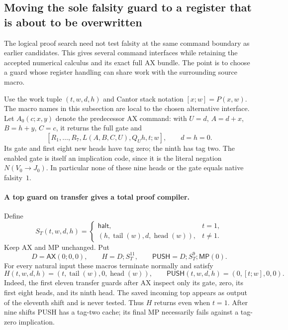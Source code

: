 \subsection{Moving the sole falsity guard to a register that is about to be overwritten}
\label{sec:guard-relocation}
The logical proof search need not test falsity at the same command boundary
as earlier candidates.  This gives several command interfaces while retaining
the accepted numerical calculus and its exact full AX bundle.  The point is
to choose a guard whose register handling can share work with the surrounding
source macro.

Use the work tuple $(t,w,d,h)$ and Cantor stack notation $[x;w]=P(x,w)$.
The macro names in this subsection are local to the chosen alternative
interface. Let $A_0(c;x,y)$ denote the predecessor AX command: with
$U=d$, $A=d+x$, $B=h+y$, $C=c$, it returns the full gate and
\[
 [R_1,\ldots,R_7,L(A,B,C,U),Q_Uh,t;w],
 \qquad d=h=0.
\]
Its gate and first eight new heads have tag zero; the ninth has tag two.
The enabled gate is itself an implication code, since it is the literal
negation $N(V_0\to J_0)$.  In particular none of these nine heads or the
gate equals native falsity~$1$.

\paragraph{A top guard on transfer gives a total proof compiler.}
Define
\[
 S_T(t,w,d,h)=
 \begin{cases}
  \mathsf{halt},&t=1,\\
  (h,\operatorname{tail}(w),d,\operatorname{head}(w)),&t\ne1.
 \end{cases}
\]
Keep AX and MP unchanged.  Put
\[
 D=\mathsf{AX}(0;0,0),\qquad
 H=D;S_T^{11},\qquad
 \mathsf{PUSH}=D;S_T^9;\mathsf{MP}(0).
\]
For every natural input these macros terminate normally and satisfy
\[
 H(t,w,d,h)=(t,\operatorname{tail}(w),0,\operatorname{head}(w)),
 \qquad
 \mathsf{PUSH}(t,w,d,h)=(0,[t;w],0,0).
\]
Indeed, the first eleven transfer guards after AX inspect only its gate,
zero, its first eight heads, and its ninth head.  The saved incoming top
appears as output of the eleventh shift and is never tested.  Thus $H$
returns even when $t=1$.  After nine shifts PUSH has a tag-two cache;
its final MP necessarily fails against a tag-zero implication.

